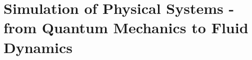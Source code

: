\section{Simulation of Physical Systems - from Quantum Mechanics to Fluid Dynamics}
\thispagestyle{plain}
\label{sec:qm_to_fluid}



